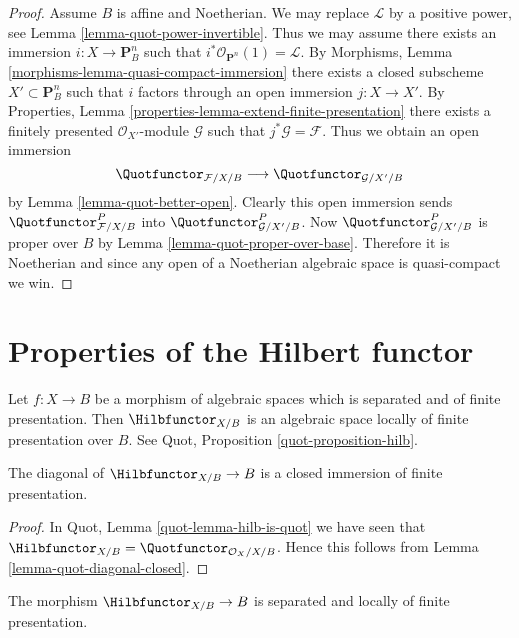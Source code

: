 \begin{proof}
\medskip\noindent
Assume $B$ is affine and Noetherian. We may replace $\mathcal{L}$
by a positive power, see Lemma \ref{lemma-quot-power-invertible}.
Thus we may assume there exists an immersion $i : X \to \mathbf{P}^n_B$
such that $i^*\mathcal{O}_{\mathbf{P}^n}(1) = \mathcal{L}$. By
Morphisms, Lemma \ref{morphisms-lemma-quasi-compact-immersion}
there exists a closed subscheme $X' \subset \mathbf{P}^n_B$
such that $i$ factors through an open immersion $j : X \to X'$.
By Properties, Lemma \ref{properties-lemma-extend-finite-presentation}
there exists a finitely presented $\mathcal{O}_{X'}$-module
$\mathcal{G}$ such that $j^*\mathcal{G} = \mathcal{F}$.
Thus we obtain an open immersion
$$
\Quotfunctor_{\mathcal{F}/X/B}
\longrightarrow
\Quotfunctor_{\mathcal{G}/X'/B}
$$
by Lemma \ref{lemma-quot-better-open}. Clearly this open immersion
sends $\Quotfunctor^P_{\mathcal{F}/X/B}$ into
$\Quotfunctor^P_{\mathcal{G}/X'/B}$. Now
$\Quotfunctor^P_{\mathcal{G}/X'/B}$ is proper over $B$ by
Lemma \ref{lemma-quot-proper-over-base}.
Therefore it is Noetherian and since any open of a Noetherian
algebraic space is quasi-compact we win.
\end{proof}




\section{Properties of the Hilbert functor}
\label{section-hilb}

\noindent
Let $f : X \to B$ be a morphism of algebraic spaces which is
separated and of finite presentation. Then
$\Hilbfunctor_{X/B}$ is an algebraic space locally of finite
presentation over $B$. See Quot, Proposition \ref{quot-proposition-hilb}.

\begin{lemma}
\label{lemma-hilb-diagonal-closed}
The diagonal of $\Hilbfunctor_{X/B} \to B$ is a closed immersion
of finite presentation.
\end{lemma}

\begin{proof}
In Quot, Lemma \ref{quot-lemma-hilb-is-quot} we have seen that
$\Hilbfunctor_{X/B} = \Quotfunctor_{\mathcal{O}_X/X/B}$.
Hence this follows from Lemma \ref{lemma-quot-diagonal-closed}.
\end{proof}

\begin{lemma}
\label{lemma-hilb-s-lfp}
The morphism $\Hilbfunctor_{X/B} \to B$ is separated
and locally of finite presentation.
\end{lemma}

